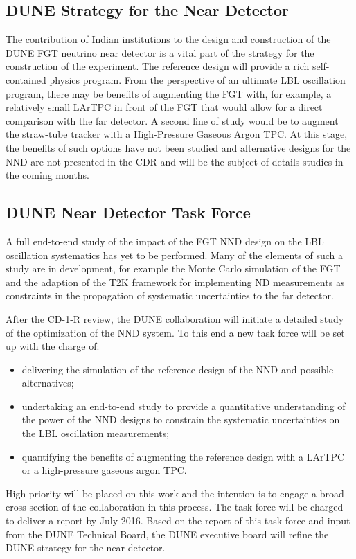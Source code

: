 \subsection{DUNE Strategy for the Near Detector}

The contribution of Indian institutions to the design and construction of the DUNE 
FGT neutrino near detector is a vital part of the strategy for the construction 
of the experiment. The reference design will provide a rich self-contained physics 
program. From the perspective of an ultimate LBL oscillation program, there may 
be benefits of augmenting the FGT with, for example, a relatively small LArTPC 
in front of the FGT that would allow for a direct comparison with the far detector. 
A second line of study would be to augment the straw-tube tracker  with 
a High-Pressure Gaseous Argon TPC. At this stage, the benefits of such options 
have not been studied and alternative designs for the NND are not presented in 
the CDR and will be the subject of details studies in the coming months. 

\subsection{DUNE Near Detector Task Force}

A full end-to-end study of the impact of the FGT NND design on the LBL oscillation 
systematics has yet to be performed. Many of the elements of such a study are in 
development, for example the Monte Carlo simulation of the FGT and the adaption 
of the T2K framework for implementing ND measurements as constraints in the propagation 
of systematic uncertainties to the far detector. 

After the CD-1-R review, the DUNE collaboration will initiate a detailed study 
of the optimization of the NND system. To this end a new task force will be set 
up with the charge of:

\begin{itemize}
\item delivering the simulation of the reference design of the NND and possible alternatives;

\item undertaking an end-to-end study to provide a quantitative understanding of 
the power of the NND designs to constrain the systematic uncertainties on the LBL 
oscillation measurements;

\item quantifying the benefits of augmenting the reference design with a LArTPC 
or a high-pressure gaseous argon TPC.
\end{itemize}

High priority will be placed on this work and the intention is to engage a broad 
cross section of the collaboration in this process. The task force will be charged 
to deliver a report by July 2016. Based on the report of this task force and input 
from the DUNE Technical Board, the DUNE executive board will refine the DUNE strategy 
for the near detector.



